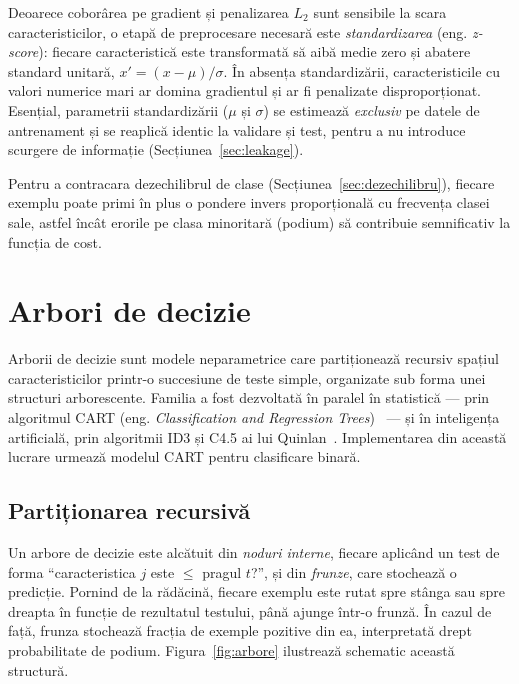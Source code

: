 \documentclass[12pt,a4paper]{report}
\begin{document}
Deoarece coborârea pe gradient și penalizarea $L_2$ sunt sensibile la scara caracteristicilor, o
etapă de preprocesare necesară este \emph{standardizarea} (eng. \emph{z-score}): fiecare
caracteristică este transformată să aibă medie zero și abatere standard unitară,
$x' = (x - \mu)/\sigma$. În absența standardizării, caracteristicile cu valori numerice mari ar
domina gradientul și ar fi penalizate disproporționat. Esențial, parametrii standardizării
($\mu$ și $\sigma$) se estimează \emph{exclusiv} pe datele de antrenament și se reaplică identic
la validare și test, pentru a nu introduce scurgere de informație (Secțiunea~\ref{sec:leakage}).

Pentru a contracara dezechilibrul de clase (Secțiunea~\ref{sec:dezechilibru}), fiecare exemplu
poate primi în plus o pondere invers proporțională cu frecvența clasei sale, astfel încât
erorile pe clasa minoritară (podium) să contribuie semnificativ la funcția de cost.

\section{Arbori de decizie}
\label{sec:tree}

Arborii de decizie sunt modele neparametrice care partiționează recursiv spațiul
caracteristicilor printr-o succesiune de teste simple, organizate sub forma unei structuri
arborescente. Familia a fost dezvoltată în paralel în statistică --- prin algoritmul CART
(eng. \emph{Classification and Regression Trees})~\cite{breiman1984cart} --- și în inteligența
artificială, prin algoritmii ID3 și C4.5 ai lui Quinlan~\cite{quinlan1986induction,
quinlan1993c45}. Implementarea din această lucrare urmează modelul CART pentru clasificare
binară.

\subsection{Partiționarea recursivă}

Un arbore de decizie este alcătuit din \emph{noduri interne}, fiecare aplicând un test de forma
``caracteristica $j$ este $\leq$ pragul $t$?'', și din \emph{frunze}, care stochează o
predicție. Pornind de la rădăcină, fiecare exemplu este rutat spre stânga sau spre dreapta în
funcție de rezultatul testului, până ajunge într-o frunză. În cazul de față, frunza stochează
fracția de exemple pozitive din ea, interpretată drept probabilitate de podium. Figura~\ref{fig:arbore}
ilustrează schematic această structură.
\end{document}
